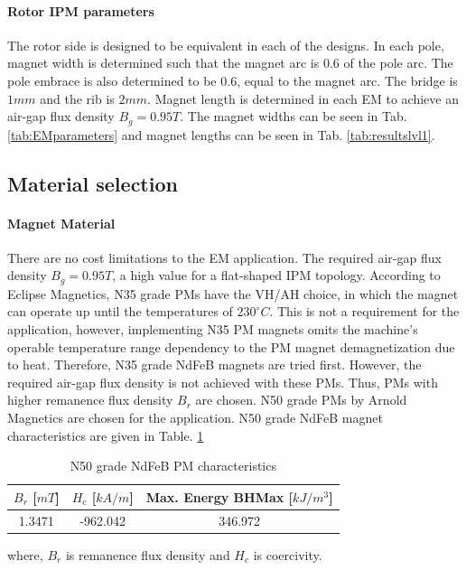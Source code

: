\documentclass [a4 paper, 11pt, titlepage] {article}
\begin{document}
	\paragraph{Rotor IPM parameters}
	The rotor side is designed to be equivalent in each of the designs. In each pole, magnet width is determined such that the magnet arc is 0.6 of the pole arc. The pole embrace is also determined to be 0.6, equal to the magnet arc. The bridge is $1mm$ and the rib is $2mm$. Magnet length is determined in each EM to achieve an air-gap flux density $B_g=0.95T$. The magnet widths can be seen in Tab. \ref{tab:EMparameters} and magnet lengths can be seen in Tab. \ref{tab:resultslvl1}.
	
	\subsection{Material selection}
	
	\paragraph{Magnet Material} There are no cost limitations to the EM application. The required air-gap flux density $B_g=0.95T$, a high value for a flat-shaped IPM topology. According to Eclipse Magnetics, N35 grade PMs have the VH/AH choice, in which the magnet can operate up until the temperatures of $230^{\circ}C$. This is not a requirement for the application, however, implementing N35 PM magnets omits the machine's operable temperature range dependency to the PM magnet demagnetization due to heat. Therefore, N35 grade NdFeB magnets are tried first. However, the required air-gap flux density is not achieved with these PMs. Thus, PMs with higher remanence flux density $B_r$ are chosen. N50 grade PMs by Arnold Magnetics are chosen for the application. N50 grade NdFeB magnet characteristics are given in Table. \ref{tab:N50}
	
	\begin{table}[h]
		\begin{center}
			\begin{tabular}{c|c|c}
				$B_r$ [$mT$] & $H_c$ [$kA/m$] & Max. Energy BHMax [$kJ/m^3$] \\
				\hline
				1.3471 & -962.042 & 346.972
			\end{tabular}
		\end{center}
		\caption{N50 grade NdFeB PM characteristics}
		\label{tab:N50}
	\end{table}
	where, $B_r$ is remanence flux density and $H_c$ is coercivity.
	
\end{document}
